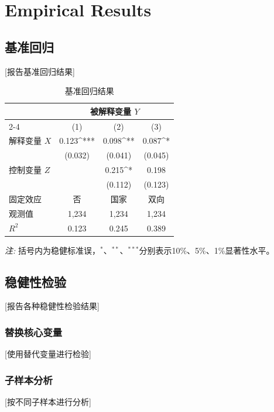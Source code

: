 \documentclass[a4paper,12pt]{article}
\numberwithin{equation}{section}
\begin{document}
\section{Empirical Results}
\label{sec:results}

\subsection{基准回归}
[报告基准回归结果]

\begin{table}[htbp]
\caption{基准回归结果}
\label{tab:baseline}
\centering
\begin{tabular}{lccc}
\toprule
 & \multicolumn{3}{c}{被解释变量 $Y$} \\
\cmidrule(lr){2-4}
 & (1) & (2) & (3) \\
\midrule
解释变量 $X$ & 0.123^{***} & 0.098^{**} & 0.087^{*} \\
            & (0.032) & (0.041) & (0.045) \\
控制变量 $Z$ & & 0.215^{*} & 0.198 \\
            & & (0.112) & (0.123) \\
\midrule
固定效应 & 否 & 国家 & 双向 \\
观测值 & 1,234 & 1,234 & 1,234 \\
$R^2$ & 0.123 & 0.245 & 0.389 \\
\bottomrule
\end{tabular}
\begin{minipage}{\textwidth}
\smallskip
\textit{注:} 括号内为稳健标准误，$^{*}$、$^{**}$、$^{***}$分别表示10\%、5\%、1\%显著性水平。
\end{minipage}
\end{table}

\subsection{稳健性检验}
[报告各种稳健性检验结果]

\subsubsection{替换核心变量}
[使用替代变量进行检验]

\subsubsection{子样本分析}
[按不同子样本进行分析]
\end{document}
